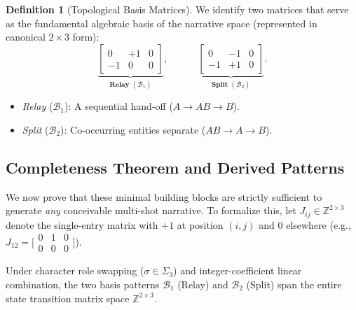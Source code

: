 \documentclass[sigconf,review,anonymous]{acmart}
\theoremstyle{definition}
\newtheorem{definition}{Definition}[section]
\newcommand{\calB}{\mathcal{B}}
\begin{document}
\begin{definition}[Topological Basis Matrices]
\label{def:basis}
We identify two matrices that serve as the fundamental algebraic basis of the narrative space (represented in canonical $2 \times 3$ form):
\begin{equation}
\underbrace{\begin{bmatrix} 0 & +1 & 0 \\ -1 & 0 & 0 \end{bmatrix}}_{\textbf{Relay } (\calB_1)}, \quad\quad\quad
\underbrace{\begin{bmatrix} 0 & -1 & 0 \\ -1 & +1 & 0 \end{bmatrix}}_{\textbf{Split } (\calB_2)}.
\label{eq:basis_matrices}
\end{equation}
\begin{itemize}[leftmargin=*,nosep]
  \item \emph{Relay} ($\calB_1$): A sequential hand-off ($A \!\to\! AB \!\to\! B$).
  \item \emph{Split} ($\calB_2$): Co-occurring entities separate ($AB \!\to\! A \!\to\! B$).
\end{itemize}
\end{definition}

\subsection{Completeness Theorem and Derived Patterns}
\label{sec:completeness}

We now prove that these minimal building blocks are strictly sufficient to generate \emph{any} conceivable multi-shot narrative. To formalize this, let $J_{ij} \in \mathbb{Z}^{2 \times 3}$ denote the single-entry matrix with $+1$ at position $(i,j)$ and $0$ elsewhere (e.g., $J_{12} = \bigl[\begin{smallmatrix} 0 & 1 & 0 \\ 0 & 0 & 0 \end{smallmatrix}\bigr]$).

\begin{theorem}
\label{thm:completeness}
Under character role swapping ($\sigma \in \Sigma_3$) and integer-coefficient linear combination, the two basis patterns $\calB_1$ (Relay) and $\calB_2$ (Split) span the entire state transition matrix space $\mathbb{Z}^{2 \times 3}$.
\end{theorem}
\end{document}

